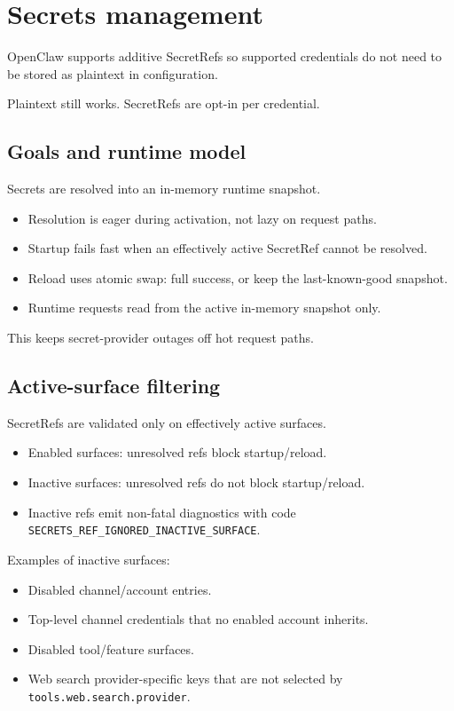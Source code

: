 \clearpage

\section{Secrets management}


OpenClaw supports additive SecretRefs so supported credentials do not need to be stored as plaintext in configuration.

Plaintext still works. SecretRefs are opt-in per credential.

\subsection{Goals and runtime model}


Secrets are resolved into an in-memory runtime snapshot.

\begin{itemize}
  \item Resolution is eager during activation, not lazy on request paths.
  \item Startup fails fast when an effectively active SecretRef cannot be resolved.
  \item Reload uses atomic swap: full success, or keep the last-known-good snapshot.
  \item Runtime requests read from the active in-memory snapshot only.
\end{itemize}


This keeps secret-provider outages off hot request paths.

\subsection{Active-surface filtering}


SecretRefs are validated only on effectively active surfaces.

\begin{itemize}
  \item Enabled surfaces: unresolved refs block startup/reload.
  \item Inactive surfaces: unresolved refs do not block startup/reload.
  \item Inactive refs emit non-fatal diagnostics with code \texttt{SECRETS\_REF\_IGNORED\_INACTIVE\_SURFACE}.
\end{itemize}


Examples of inactive surfaces:

\begin{itemize}
  \item Disabled channel/account entries.
  \item Top-level channel credentials that no enabled account inherits.
  \item Disabled tool/feature surfaces.
  \item Web search provider-specific keys that are not selected by \texttt{tools.web.search.provider}.
\end{itemize}

